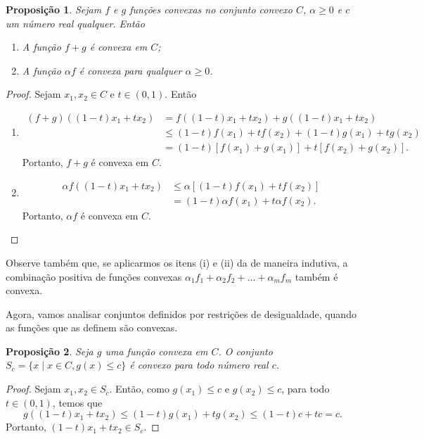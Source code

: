 \documentclass[12pt,a4paper]{scrartcl}
\newtheorem{prop}{Proposição}
\theoremstyle{definition}%
\begin{document}
\begin{prop} \label{prop:combinacao_funcoes_convexa}
Sejam $f$ e $g$ funções convexas no conjunto convexo $C$, $\alpha \geq 0$ e $c$ um número real qualquer. Então
\begin{enumerate}
	\item[(i)] A função $f+g$ é convexa em $C$;
	\item[(ii)] A função $\alpha f$ é convexa para qualquer $\alpha \geq 0$.
\end{enumerate}
\end{prop}
\begin{proof}
Sejam $x_{1}, x_{2} \in C$ e $t\in (0,1)$. Então
\begin{enumerate}
\item[(i)] 
\[
\begin{aligned}
(f+g)((1-t)x_{1} + tx_{2}) &= f((1-t)x_{1} + tx_{2}) + g((1-t)x_{1} + tx_{2}) \\
&\leq (1-t)f(x_{1}) + tf(x_{2}) + (1-t)g(x_{1}) + tg(x_{2}) \\
&= (1-t)[f(x_{1}) + g(x_{1})] + t[f(x_{2}) + g(x_{2})] .
\end{aligned}
\]
Portanto, $f+g$ é convexa em $C$.
\item[(ii)] 
\[
\begin{aligned}
\alpha f((1-t)x_{1} + tx_{2}) &\leq \alpha [(1-t)f(x_{1}) + tf(x_{2})] \\
&= (1-t)\alpha f(x_{1}) + t\alpha f(x_{2}) .
\end{aligned}
\]
Portanto, $\alpha f$ é convexa em $C$.
\end{enumerate}	
\end{proof}

Observe também que, se aplicarmos os itens (i) e (ii) da  de maneira indutiva, a combinação positiva de funções convexas $\alpha_{1} f_{1} +\alpha_{2} f_{2} + \ldots +\alpha_{m} f_{m}$ também é convexa. 

Agora, vamos analisar conjuntos definidos por restrições de desigualdade, quando as funções que as definem são convexas.

\begin{prop}
Seja $g$ uma função convexa em $C$. O conjunto $S_{c} = \{ x \mid x\in C, g(x)\leq c \}$ é convexo para todo número real $c$.
\end{prop}
\begin{proof}
Sejam $x_{1}, x_{2} \in S_{c}$. Então, como $g(x_1) \leq c$ e $g(x_2) \leq c$, para todo $t\in (0,1)$, temos que
\[
g((1-t)x_{1} + tx_{2}) \leq (1-t)g(x_{1}) + tg(x_{2}) \leq (1-t)c + tc = c.
\]
Portanto, $(1-t)x_{1} + tx_{2} \in S_{c}$.
\end{proof}
\end{document}
